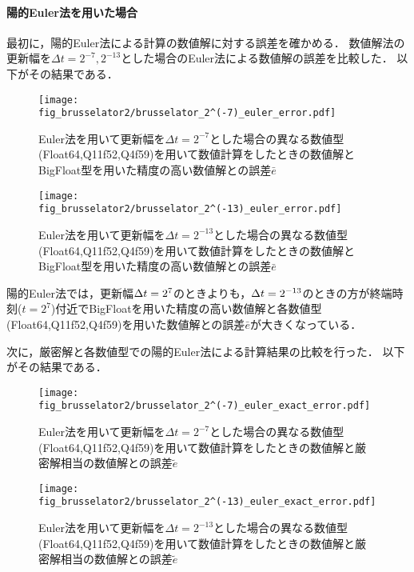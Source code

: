 \paragraph*{陽的Euler法を用いた場合}
最初に，陽的Euler法による計算の数値解に対する誤差を確かめる．
数値解法の更新幅を$\Delta t = 2^{-7},2^{-13}$とした場合のEuler法による数値解の誤差を比較した．
以下がその結果である．
\begin{figure}[H]
    \centering
    \begin{minipage}[b]{0.48\columnwidth}
        \centering
        \texttt{[image: fig\_brusselator2/brusselator\_2^(-7)\_euler\_error.pdf]}
        \caption{Euler法を用いて更新幅を$\Delta t = 2^{-7}$とした場合の異なる数値型(Float64,Q11f52,Q4f59)を用いて数値計算をしたときの数値解とBigFloat型を用いた精度の高い数値解との誤差$\bar{e}$}
        \label{fig:brusselator_2^(-7)_euler_error}
    \end{minipage}
    \hspace{0.01\columnwidth}
    \begin{minipage}[b]{0.48\columnwidth}
        \centering
        \texttt{[image: fig\_brusselator2/brusselator\_2^(-13)\_euler\_error.pdf]}
        \caption{Euler法を用いて更新幅を$\Delta t =  2^{-13}$とした場合の異なる数値型(Float64,Q11f52,Q4f59)を用いて数値計算をしたときの数値解とBigFloat型を用いた精度の高い数値解との誤差$\bar{e}$}
        \label{fig:brusselator_2^(-13)_euler_error}
    \end{minipage}
\end{figure}
陽的Euler法では，更新幅$\Delta t = 2^{7}$のときよりも，$\Delta t = 2^{-13}$のときの方が終端時刻($t=2^7$)付近でBigFloatを用いた精度の高い数値解と各数値型(Float64,Q11f52,Q4f59)を用いた数値解との誤差$\bar{e}$が大きくなっている．%

次に，厳密解と各数値型での陽的Euler法による計算結果の比較を行った．
以下がその結果である．\\
\begin{figure}[H]
    \centering
    \begin{minipage}[b]{0.48\columnwidth}
        \centering
        \texttt{[image: fig\_brusselator2/brusselator\_2^(-7)\_euler\_exact\_error.pdf]}
        \caption{Euler法を用いて更新幅を$\Delta t = 2^{-7}$とした場合の異なる数値型(Float64,Q11f52,Q4f59)を用いて数値計算をしたときの数値解と厳密解相当の数値解との誤差$\tilde{e}$}
        \label{fig:brusselator_2^(-7)_euler_exact_error}
    \end{minipage}
    \hspace{0.01\columnwidth}
    \begin{minipage}[b]{0.48\columnwidth}
        \centering
        \texttt{[image: fig\_brusselator2/brusselator\_2^(-13)\_euler\_exact\_error.pdf]}
        \caption{Euler法を用いて更新幅を$\Delta t =  2^{-13}$とした場合の異なる数値型(Float64,Q11f52,Q4f59)を用いて数値計算をしたときの数値解と厳密解相当の数値解との誤差$\tilde{e}$}
        \label{fig:brusselator_2^(-13)_euler_exact_error}
    \end{minipage}
\end{figure}



